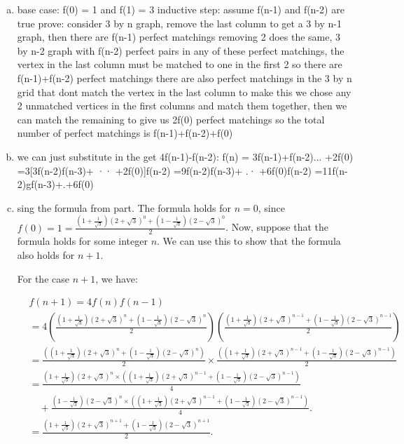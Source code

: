 \documentclass[12pt]{article}
\begin{document}
\begin{enumerate}[(a)]

    \item base case: f(0) = 1 and f(1) = 3\newline
    inductive step: assume f(n-1) and f(n-2) are true
    \newline prove: consider 3 by n graph, remove the last column to get a 3 by n-1 graph, then there are f(n-1) perfect matchings
    \newline removing 2 does the same, 3 by n-2 graph with f(n-2) perfect pairs
    in any of these perfect matchings, the vertex in the last column must be matched to one in the first 2 so there are f(n-1)+f(n-2) perfect matchings
    \newline there are also perfect matchings in the 3 by n grid that dont match the vertex in the last column to make this we chose any 2 unmatched vertices in the first columns and match them together, then we can match the remaining to give us 2f(0) perfect matchings
    \newline so the total number of perfect matchings is f(n-1)+f(n-2)+f(0)

    \item we can just substitute in the get 4f(n-1)-f(n-2):
    \newline f(n) = 3f(n-1)+f(n-2)... +2f(0)
=3[3f(n-2)f(n-3)+ ·· +2f(0)]f(n-2)
=9f(n-2)f(n-3)+ .· +6f(0)f(n-2)
=11f(n-2)gf(n-3)+.+6f(0)

    \item sing the formula from part. The formula holds for \( n = 0 \), since \( f(0) = 1 = \frac{{(1 + \frac{1}{\sqrt{3}})(2 + \sqrt{3})^0 + (1 - \frac{1}{\sqrt{3}})(2 - \sqrt{3})^0}}{2} \). Now, suppose that the formula holds for some integer \( n \). We can use this to show that the formula also holds for \( n + 1 \).

    For the case \( n + 1 \), we have:

    \[
    \begin{aligned}
    &f(n + 1) = 4f(n)f(n - 1) \\
    &= 4\left(\frac{{(1 + \frac{1}{\sqrt{3}})(2 + \sqrt{3})^n + (1 - \frac{1}{\sqrt{3}})(2 - \sqrt{3})^n}}{2}\right) \left(\frac{{(1 + \frac{1}{\sqrt{3}})(2 + \sqrt{3})^{n - 1} + (1 - \frac{1}{\sqrt{3}})(2 - \sqrt{3})^{n - 1}}}{2}\right) \\
    &= \frac{{\left((1 + \frac{1}{\sqrt{3}})(2 + \sqrt{3})^n + (1 - \frac{1}{\sqrt{3}})(2 - \sqrt{3})^n\right)}}{2} \times \frac{{\left((1 + \frac{1}{\sqrt{3}})(2 + \sqrt{3})^{n - 1} + (1 - \frac{1}{\sqrt{3}})(2 - \sqrt{3})^{n - 1}\right)}}{2} \\
    &= \frac{{(1 + \frac{1}{\sqrt{3}})(2 + \sqrt{3})^n \times \left((1 + \frac{1}{\sqrt{3}})(2 + \sqrt{3})^{n - 1} + (1 - \frac{1}{\sqrt{3}})(2 - \sqrt{3})^{n - 1}\right)}}{4} \\
    &\quad + \frac{{(1 - \frac{1}{\sqrt{3}})(2 - \sqrt{3})^n \times \left((1 + \frac{1}{\sqrt{3}})(2 + \sqrt{3})^{n - 1} + (1 - \frac{1}{\sqrt{3}})(2 - \sqrt{3})^{n - 1}\right)}}{4}. \\
    &= \frac{{(1 + \frac{1}{\sqrt{3}})(2 + \sqrt{3})^{n + 1} + (1 - \frac{1}{\sqrt{3}})(2 - \sqrt{3})^{n + 1}}}{2}.
    \end{aligned}
    \]
    

\end{enumerate}
\end{document}
